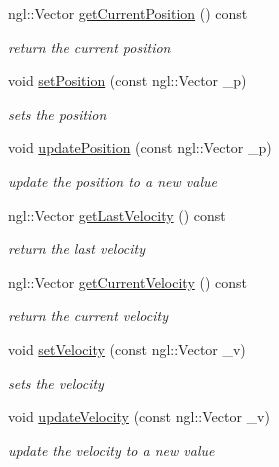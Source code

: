 \begin{DoxyCompactItemize}
ngl::Vector \hyperlink{class_particle_a7bb9e571a782e273da7efcf77b3b578f}{getCurrentPosition} () const 
\begin{DoxyCompactList}\small\item\em return the current position \item\end{DoxyCompactList}\item 
void \hyperlink{class_particle_a6e5693325b3f5b49458e66624576a0a7}{setPosition} (const ngl::Vector \_\-p)
\begin{DoxyCompactList}\small\item\em sets the position \item\end{DoxyCompactList}\item 
void \hyperlink{class_particle_a4ea44dad91df2b0374f2d40d44452b76}{updatePosition} (const ngl::Vector \_\-p)
\begin{DoxyCompactList}\small\item\em update the position to a new value \item\end{DoxyCompactList}\item 
ngl::Vector \hyperlink{class_particle_ab12a2455cfdb31df6dd9e67eaffee833}{getLastVelocity} () const 
\begin{DoxyCompactList}\small\item\em return the last velocity \item\end{DoxyCompactList}\item 
ngl::Vector \hyperlink{class_particle_af19d3d862218eda779fc03d5e1678abe}{getCurrentVelocity} () const 
\begin{DoxyCompactList}\small\item\em return the current velocity \item\end{DoxyCompactList}\item 
void \hyperlink{class_particle_ad823b77c5f15777b71f2756698c6ec23}{setVelocity} (const ngl::Vector \_\-v)
\begin{DoxyCompactList}\small\item\em sets the velocity \item\end{DoxyCompactList}\item 
void \hyperlink{class_particle_adacb41b0128b528cb8313337fa224672}{updateVelocity} (const ngl::Vector \_\-v)
\begin{DoxyCompactList}\small\item\em update the velocity to a new value \item\end{DoxyCompactList}\item 

\end{DoxyCompactItemize}
